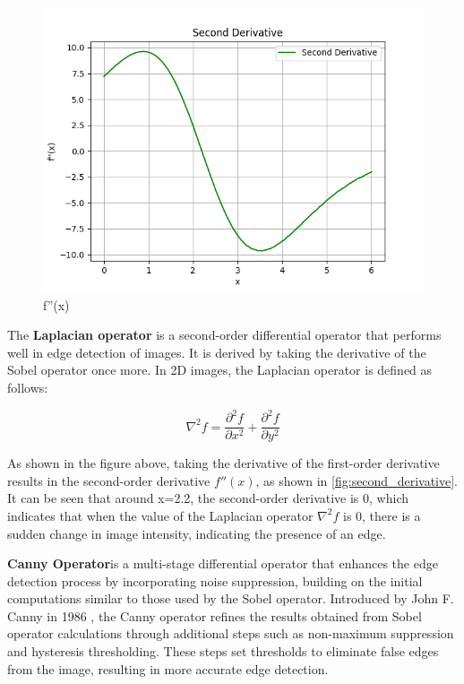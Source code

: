 \begin{figure}[htbp]
\begin{minipage}[b]{0.32\textwidth}
        \centering
        \includegraphics[width=\textwidth]{./fig/second_derivative.png}
        \caption{f''(x)}
        \label{fig:second_derivative}
    \end{minipage}
\end{figure}

The \textbf{Laplacian operator} is a second-order differential operator that performs well in edge detection of images. It is derived by taking the derivative of the Sobel operator once more. In 2D images, the Laplacian operator is defined as follows: 

\begin{equation} 
    \nabla^2 f = \frac{\partial^2 f}{\partial x^2} + \frac{\partial^2 f}{\partial y^2} 
\end{equation} 

As shown in the figure above, taking the derivative of the first-order derivative results in the second-order derivative $f''(x)$, as shown in \autoref{fig:second_derivative}. It can be seen that around x=2.2, the second-order derivative is 0, which indicates that when the value of the Laplacian operator $\nabla^2 f$ is 0, there is a sudden change in image intensity, indicating the presence of an edge.

\textbf{Canny Operator}is a multi-stage differential operator that enhances the edge detection process by incorporating noise suppression, building on the initial computations similar to those used by the Sobel operator. Introduced by John F. Canny in 1986 \cite{3.2}, the Canny operator refines the results obtained from Sobel operator calculations through additional steps such as non-maximum suppression and hysteresis thresholding. These steps set thresholds to eliminate false edges from the image, resulting in more accurate edge detection.

